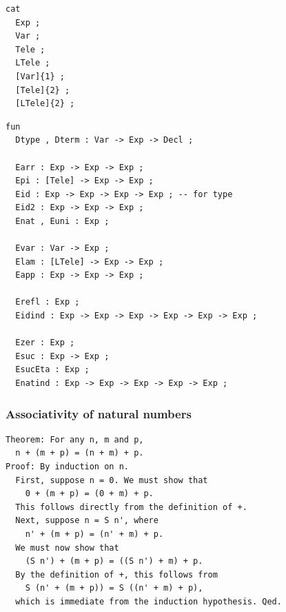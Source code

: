 \documentclass[10pt]{beamer}
\begin{document}
\begin{frame}[fragile]
\begin{verbatim}
cat
  Exp ;
  Var ;
  Tele ;
  LTele ;
  [Var]{1} ;
  [Tele]{2} ;
  [LTele]{2} ;
\end{verbatim}
\end{frame}

\begin{frame}[fragile]

\begin{verbatim}
fun
  Dtype , Dterm : Var -> Exp -> Decl ;

  Earr : Exp -> Exp -> Exp ;
  Epi : [Tele] -> Exp -> Exp ;
  Eid : Exp -> Exp -> Exp -> Exp ; -- for type
  Eid2 : Exp -> Exp -> Exp ;
  Enat , Euni : Exp ;

  Evar : Var -> Exp ;
  Elam : [LTele] -> Exp -> Exp ;
  Eapp : Exp -> Exp -> Exp ;

  Erefl : Exp ;
  Eidind : Exp -> Exp -> Exp -> Exp -> Exp -> Exp ;

  Ezer : Exp ;
  Esuc : Exp -> Exp ;
  EsucEta : Exp ; 
  Enatind : Exp -> Exp -> Exp -> Exp -> Exp ;
\end{verbatim}
\end{frame}


\begin{frame}

\end{frame}

\begin{frame}[fragile]
\frametitle{Associativity of natural numbers}
\begin{verbatim}
Theorem: For any n, m and p,
  n + (m + p) = (n + m) + p.
Proof: By induction on n.
  First, suppose n = 0. We must show that
    0 + (m + p) = (0 + m) + p.
  This follows directly from the definition of +.
  Next, suppose n = S n', where
    n' + (m + p) = (n' + m) + p.
  We must now show that
    (S n') + (m + p) = ((S n') + m) + p.
  By the definition of +, this follows from
    S (n' + (m + p)) = S ((n' + m) + p),
  which is immediate from the induction hypothesis. Qed.
\end{verbatim}
\end{frame}

\begin{frame}



\end{frame}

\begin{frame}



\end{frame}
\end{document}
